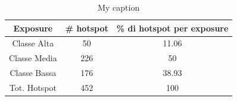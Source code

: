 \begin{table}[H]
	\centering
	\caption{My caption}
	\label{risultati_roma_pescara}
	\begin{tabular}{|c|c|c|}
		\hline
		\rowcolor[HTML]{C0C0C0} 
		\textbf{Exposure} & \textbf{\# hotspot} & \textbf{\% di hotspot per exposure} \\ \hline
		Classe Alta       & 50                  & 11.06                                   \\ \hline
		Classe Media      & 226                  & 50                               \\ \hline
		Classe Bassa      & 176                 & 38.93                               \\ \hline
		Tot. Hotspot      & 452                & 100                                 \\ \hline
	\end{tabular}
\end{table}



